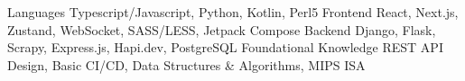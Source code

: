 
\begin{cvskills}
  \cvskill
    {Languages} %
    {Typescript/Javascript, Python, Kotlin, Perl5} %
  \cvskill
    {Frontend}
    {React, Next.js, Zustand, WebSocket, SASS/LESS, Jetpack Compose}
  \cvskill
    {Backend} %
    {Django, Flask, Scrapy, Express.js, Hapi.dev, PostgreSQL} %
  \cvskill
    {Foundational Knowledge}
    {REST API Design, Basic CI/CD, Data Structures \& Algorithms, MIPS ISA}
\end{cvskills}
